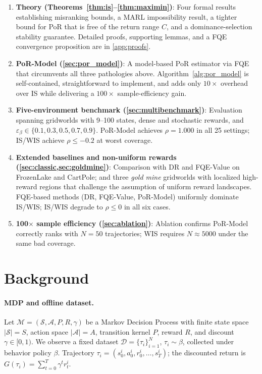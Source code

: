 \documentclass[10pt]{article}
\theoremstyle{plain}
\theoremstyle{definition}
\theoremstyle{remark}
\newcommand{\calM}{\mathcal{M}}
\newcommand{\calS}{\mathcal{S}}
\newcommand{\calA}{\mathcal{A}}
\newcommand{\calD}{\mathcal{D}}
\begin{document}
\begin{enumerate}
  \item \textbf{Theory (Theorems~\ref{thm:is}--\ref{thm:maximin})}: Four
    formal results establishing misranking bounds, a MARL impossibility result,
    a tighter bound for PoR that is free of the return range $C$, and a
    dominance-selection stability guarantee.  Detailed proofs, supporting lemmas,
    and a FQE convergence proposition are in \cref{app:proofs}.

  \item \textbf{PoR-Model (\cref{sec:por_model})}: A model-based PoR
    estimator via FQE that circumvents all three pathologies above.  Algorithm~\ref{alg:por_model}
    is self-contained, straightforward to implement, and adds only $10\times$
    overhead over IS while delivering a $100\times$ sample-efficiency gain.

  \item \textbf{Five-environment benchmark (\cref{sec:multibenchmark})}:
    Evaluation spanning gridworlds with 9--100 states, dense and stochastic
    rewards, and $\varepsilon_\beta \in \{0.1,0.3,0.5,0.7,0.9\}$.  PoR-Model
    achieves $\rho=1.000$ in all 25 settings; IS/WIS achieve $\rho \leq -0.2$
    at worst coverage.

  \item \textbf{Extended baselines and non-uniform rewards
    (\cref{sec:classic,sec:goldmine})}: Comparison with DR and FQE-Value on
    FrozenLake and CartPole; and three \emph{gold mine} gridworlds with
    localized high-reward regions that challenge the assumption of uniform
    reward landscapes.  FQE-based methods (DR, FQE-Value, PoR-Model) uniformly
    dominate IS/WIS; IS/WIS degrade to $\rho \leq 0$ in all six cases.

  \item \textbf{100$\times$ sample efficiency (\cref{sec:ablation})}:
    Ablation confirms PoR-Model correctly ranks with $N=50$ trajectories; WIS
    requires $N\approx 5000$ under the same bad coverage.
\end{enumerate}

\section{Background}
\label{sec:background}

\paragraph{MDP and offline dataset.}
Let $\calM=(\calS,\calA,P,R,\gamma)$ be a Markov Decision Process with finite
state space $|\calS|=S$, action space $|\calA|=A$, transition kernel $P$,
reward $R$, and discount $\gamma\in[0,1)$.  We observe a fixed dataset
$\calD=\{\tau_i\}_{i=1}^N$, $\tau_i\sim\beta$, collected under behavior policy
$\beta$.  Trajectory $\tau_i=(s_0^i,a_0^i,r_0^i,\ldots,s_T^i)$; the
discounted return is $G(\tau_i)=\sum_{t=0}^T \gamma^t r_t^i$.
\end{document}
